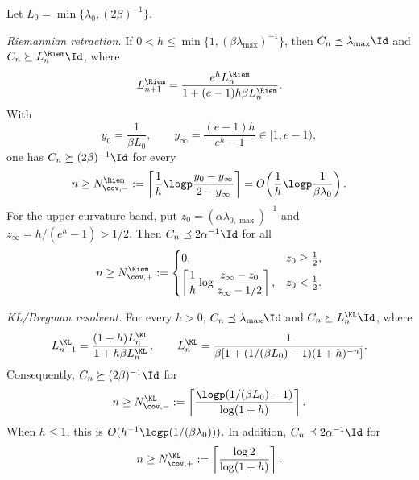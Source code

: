 \begin{proposition}
\label{prop:global:discrete-bootstrap}
Let
\(
L_0=\min\{\lambda_0,(2\beta)^{-1}\}
\).

\emph{Riemannian retraction.}
If
\(
0<h\leq\min\{1,(\beta\lambda_{\max})^{-1}\}
\), then \(C_n\preceq\lambda_{\max}\Id\) and \(C_n\succeq L_n^{\Riem}\Id\), where
\begin{equation}
\label{eq:global:riemannian-floor-recurrence}
    L_{n+1}^{\Riem}
    =\frac{e^hL_n^{\Riem}}
           {1+(e-1)h\beta L_n^{\Riem}}.
\end{equation}
With
\begin{equation}
\label{eq:global:riemannian-floor-variables}
    y_0=\frac1{\beta L_0},
    \qquad
    y_\infty=\frac{(e-1)h}{e^h-1}\in[1,e-1),
\end{equation}
one has \(C_n\succeq(2\beta)^{-1}\Id\) for every
\begin{equation}
\label{eq:global:riemannian-floor-time}
    n\geq N_{\cov,-}^{\Riem}
    :=\left\lceil
        \frac1h\logp\frac{y_0-y_\infty}{2-y_\infty}
      \right\rceil
    =O\!\left(\frac1h\logp\frac1{\beta\lambda_0}\right).
\end{equation}
For the upper curvature band, put
\(
z_0=(\alpha\lambda_{0,\max})^{-1}
\) and
\(
z_\infty=h/(e^h-1)>1/2
\).  Then \(C_n\preceq2\alpha^{-1}\Id\) for all
\begin{equation}
\label{eq:global:riemannian-upper-band-time}
    n\geq N_{\cov,+}^{\Riem}:=
    \begin{cases}
        0, & z_0\geq\tfrac12,\\[3pt]
        \left\lceil
        \dfrac1h\log\dfrac{z_\infty-z_0}{z_\infty-1/2}
        \right\rceil, & z_0<\tfrac12.
    \end{cases}
\end{equation}

\emph{KL/Bregman resolvent.}
For every \(h>0\), \(C_n\preceq\lambda_{\max}\Id\) and
\(C_n\succeq L_n^{\KL}\Id\), where
\begin{equation}
\label{eq:global:kl-floor-recurrence}
    L_{n+1}^{\KL}
    =\frac{(1+h)L_n^{\KL}}{1+h\beta L_n^{\KL}},
    \qquad
    L_n^{\KL}
    =\frac1{\beta[1+(1/(\beta L_0)-1)(1+h)^{-n}]}.
\end{equation}
Consequently, \(C_n\succeq(2\beta)^{-1}\Id\) for
\begin{equation}
\label{eq:global:kl-floor-time}
    n\geq N_{\cov,-}^{\KL}
    :=\left\lceil
      \frac{\logp(1/(\beta L_0)-1)}{\log(1+h)}
    \right\rceil.
\end{equation}
When \(h\leq1\), this is
\(
O(h^{-1}\logp(1/(\beta\lambda_0)))
\).  In addition, \(C_n\preceq2\alpha^{-1}\Id\) for
\begin{equation}
\label{eq:global:kl-upper-band-time}
    n\geq N_{\cov,+}^{\KL}
    :=\left\lceil\frac{\log2}{\log(1+h)}\right\rceil.
\end{equation}
\end{proposition}

